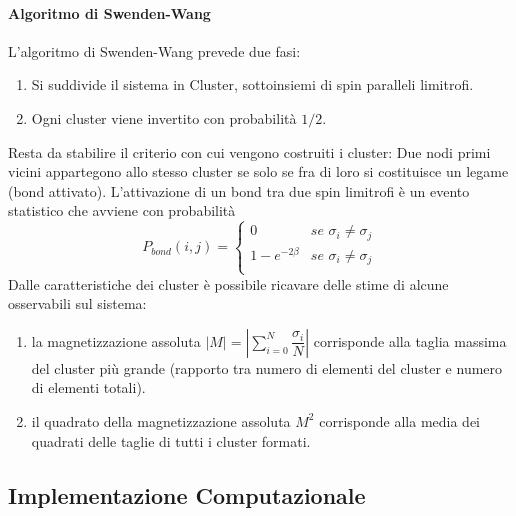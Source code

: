 \documentclass[11pt]{article}
\theoremstyle{plain}
\begin{document}
\paragraph{Algoritmo di Swenden-Wang}
L'algoritmo di Swenden-Wang prevede due fasi:
\begin{enumerate}
\item Si suddivide il sistema in Cluster, sottoinsiemi di spin paralleli limitrofi.
\item Ogni cluster viene invertito con probabilità $1/2$.
\end{enumerate}
\medskip Resta da stabilire il criterio con cui vengono costruiti i cluster:
\newline
Due nodi primi vicini appartegono allo stesso cluster se solo se fra di loro si costituisce un legame (bond attivato). L'attivazione di un bond tra due spin limitrofi è un evento statistico che avviene con probabilità
\begin{equation}
P_{bond}(i,j) = \begin{cases}
				0 & \textit{se } \sigma_i \neq \sigma_j \\
				1 - e^{-2\beta} & \textit{se } \sigma_i \neq \sigma_j \\
				\end{cases}
\end{equation}
\medskip Dalle caratteristiche dei cluster è possibile ricavare delle stime di alcune osservabili sul sistema:
\begin{enumerate}
\item la magnetizzazione assoluta $|M|= |\sum_{i=0}^{N}\dfrac{\sigma_i}{N}|$ corrisponde alla taglia massima del cluster più grande (rapporto tra numero di elementi del cluster e numero di elementi totali).
\item il quadrato della magnetizzazione assoluta $M^2$ corrisponde alla media dei quadrati delle taglie di tutti i cluster formati.
\end{enumerate}


\subsection{Implementazione Computazionale}
\end{document}
